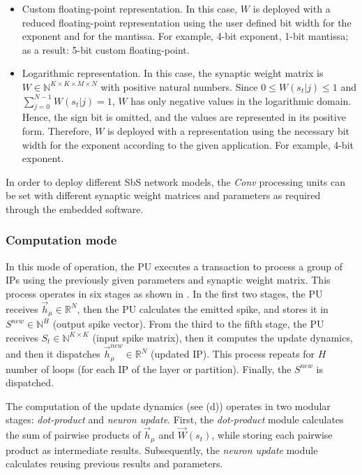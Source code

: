 \begin{itemize}
	\item{Custom floating-point representation}.
	In this case, $W$ is deployed with a reduced floating-point representation using the user defined bit width for the exponent and for the mantissa. For example, 4-bit exponent, 1-bit mantissa; as a result: 5-bit custom floating-point.
	\item{Logarithmic representation}.
	In this case, the synaptic weight matrix is $W\in\mathbb{N}^{K\times K\times M\times N}$ with positive natural numbers. Since $0\le W(s_t|j)\le1$ and $\sum_{j=0}^{N-1}W(s_t|j)=1$, $W$ has only negative values in the logarithmic domain. Hence, the sign bit is omitted, and the values are represented in its positive form. Therefore, $W$ is deployed with a representation using the necessary bit width for the exponent according to the given application. For example, 4-bit exponent.
\end{itemize}

In order to deploy different SbS network models, the \emph{Conv} processing units can be set with different synaptic weight matrices and parameters as required through the embedded software.

\subsubsection{Computation mode}
In this mode of operation, the PU executes a transaction to process a group of IPs using the previously given parameters and synaptic weight matrix. This process operates in six stages as shown in . In the first two stages, the PU receives $\vec{h}_\mu\in\mathbb{R}^{N}$, then the PU calculates the emitted spike, and stores it in $S^{new}\in\mathbb{N}^{H}$ (output spike vector). From the third to the fifth stage, the PU receives $S_t\in\mathbb{N}^{K\times K}$ (input spike matrix), then it computes the update dynamics, and then it dispatches $\vec{h}_\mu^{new}\in\mathbb{R}^{N}$ (updated IP). This process repeats for $H$ number of loops (for each IP of the layer or partition). Finally, the $S^{new}$ is dispatched.

The computation of the update dynamics (see (d)) operates in two modular stages: \emph{dot-product} and \emph{neuron update}. First, the \emph{dot-product} module calculates the sum of pairwise products of $\vec{h}_{\mu}$ and $\vec{W}(s_t)$, while storing each pairwise product as intermediate results. Subsequently, the \emph{neuron update} module calculates  reusing previous results and parameters.



